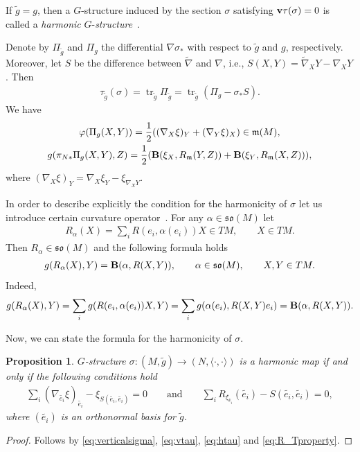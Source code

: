 \documentclass[10pt,a4paper]{amsart}
\numberwithin{equation}{section}
\newtheorem{Proposition}[Theorem]{Proposition}
\newcommand{\skal}[2]{\langle #1,#2\rangle}
\begin{document}
If $\tilde g=g$, then a $G$-structure induced by the section $\sigma$ satisfying ${\bf v}\tau(\sigma)=0$ is called a {\it harmonic} $G$-{\it structure}~\cite{gmc2}.

Denote by $\Pi_{\tilde g}$ and $\Pi_g$ the dif\/ferential $\nabla\sigma_{\ast}$ with respect to $\tilde g$ and $g$, respectively. Moreover, let $S$ be the dif\/ference between $\tilde{\nabla}$ and $\nabla$, i.e., $S(X,Y)=\tilde{\nabla}_XY-\nabla_XY$. Then
\begin{gather*}
\tau_{\tilde g}(\sigma)=\operatorname{tr}_{\tilde g}\Pi_{\tilde g}
=\operatorname{tr}_{\tilde g}(\Pi_g-\sigma_{\ast}S).
\end{gather*}
We have \cite{gmc2, cw2}
\begin{gather}
\varphi(\Pi_g(X,Y))=\frac{1}{2}((\nabla_X\xi)_Y+(\nabla_Y\xi)_X)\in\mathfrak{m}(M), \label{eq:vtau}\\
g(\pi_{N\ast}\Pi_g(X,Y),Z) =\frac{1}{2}(
{\bf B}(\xi_X,R_{\mathfrak{m}}(Y,Z))+{\bf B}(\xi_Y,R_{\mathfrak{m}}(X,Z))), \label{eq:htau}
\end{gather}
where $(\nabla_X\xi)_Y=\nabla_X\xi_Y-\xi_{\nabla_XY}$.

In order to describe explicitly the condition for the harmonicity of $\sigma$ let us introduce certain curvature operator~\cite{kn}. For any $\alpha\in\mathfrak{so}(M)$ let
\begin{gather}\label{eq:defRT}
R_{\alpha}(X)=\sum_i R(e_i,\alpha(e_i))X\in TM,\qquad X\in TM.
\end{gather}
Then $R_{\alpha}\in\mathfrak{so}(M)$ and the following formula holds
\begin{gather}\label{eq:R_Tproperty}
g(R_{\alpha}(X),Y)={\bf B}(\alpha,R(X,Y)),\qquad \alpha\in\mathfrak{so}(M),\qquad X,Y\in TM.
\end{gather}
Indeed,
\begin{gather*}
g(R_{\alpha}(X),Y) =\sum_i g(R(e_i,\alpha(e_i))X,Y)=\sum_i g(\alpha(e_i),R(X,Y)e_i) ={\bf B}(\alpha,R(X,Y)).
\end{gather*}

Now, we can state the formula for the harmonicity of $\sigma$.
\begin{Proposition}\label{prop:harmonicsigma1}
$G$-structure $\sigma\colon (M,\tilde{g})\to (N,\skal{\cdot}{\cdot})$ is a harmonic map if and only if the following conditions hold
\begin{gather*}%
\sum_i (\nabla_{\tilde{e_i}}\xi)_{\tilde{e_i}}-\xi_{S(\tilde{e_i},\tilde{e_i})}=0 \qquad\textrm{and}\qquad
\sum_iR_{\xi_{\tilde{e_i}}}(\tilde{e_i})-S(\tilde{e_i},\tilde{e_i})=0,
\end{gather*}
where $(\tilde{e_i})$ is an orthonormal basis for $\tilde{g}$.
\end{Proposition}
\begin{proof}
Follows by \eqref{eq:verticalsigma}, \eqref{eq:vtau}, \eqref{eq:htau} and \eqref{eq:R_Tproperty}.
\end{proof}
\end{document}
